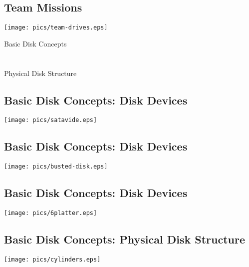 \documentclass[xga]{xdvislides}
\begin{document}
\subsection{Team Missions}
\vfill
\begin{center}
	\texttt{[image: pics/team-drives.eps]} \\
\end{center}
\vfill


\newpage
\vspace*{\fill}
\begin{center}
	\Hugesize
		Basic Disk Concepts\\ [1em]
	\hspace*{5mm}
	\blueline\\
	\hspace*{5mm}\\
		Physical Disk Structure
\end{center}
\vspace*{\fill}

\subsection{Basic Disk Concepts: Disk Devices}
\vfill
	\begin{center}
		\texttt{[image: pics/satavide.eps]} \\
	\end{center}
\vfill


\subsection{Basic Disk Concepts: Disk Devices}
	\begin{center}
		\texttt{[image: pics/busted-disk.eps]} \\
	\end{center}

\subsection{Basic Disk Concepts: Disk Devices}
\vfill
	\begin{center}
		\texttt{[image: pics/6platter.eps]} \\
	\end{center}
\vfill

\subsection{Basic Disk Concepts: Physical Disk Structure}
\vfill
	\begin{center}
		\texttt{[image: pics/cylinders.eps]} \\
	\end{center}
\vfill
\end{document}
